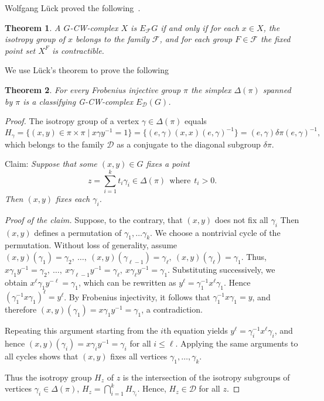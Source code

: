 \documentclass{amsart}
\numberwithin{equation}{section}
\theoremstyle{plain}
\newtheorem{thm}{Theorem}[subsection]
\theoremstyle{definition}
\begin{document}
Wolfgang L\"{u}ck proved the following~\cite{Lu}.
\begin{thm}\label{Lu}
A $G$-CW-complex $X$ is $E_\mathcal FG$ if and only if for each $x\in X$, the isotropy group  of $x$ belongs to the family $\mathcal F$, and for each group $F\in\mathcal F$ the fixed point set $X^F$ is contractible.
\end{thm}
We use L\"{u}ck's theorem to prove the following
\begin{thm}\label{Frob}
For every Frobenius injective group $\pi$ the simplex $\Delta(\pi)$ spanned by $\pi$ is a classifying G-CW-complex $E_{\mathcal D}(G)$.
\end{thm}
\begin{proof}
The isotropy group of a vertex $\gamma\in\Delta(\pi)$ equals
$$H_\gamma=\{(x,y)\in \pi\times\pi\mid x\gamma y^{-1}=1\}=\{(e,\gamma)(x,x)(e,\gamma)^{-1}\}=(e,\gamma)\delta\pi(e,\gamma)^{-1},$$
which belongs to the family $\mathcal D$ as a conjugate to the diagonal subgroup $\delta\pi$.

Claim: {\em Suppose that some $(x,y)\in G$  fixes a point $$z=\sum_{i=1}^k t_i\gamma_i\in\Delta(\pi)\ \ \text{where}\ \ t_i>0.$$
Then $(x,y)$ fixes each $\gamma_i$.}

{\em Proof of the claim.} Suppose, to the contrary, that $(x,y)$ does not fix all $\gamma_i$
Then $(x,y)$ defines a permutation of $\gamma_1,\dots\gamma_k$.
We choose a nontrivial cycle of the permutation.
Without loss of generality, assume $(x,y)(\gamma_1)=\gamma_2,\ 
\dots,\ (x,y)(\gamma_{\ell-1})=\gamma_\ell,\ (x,y)(\gamma_\ell)=\gamma_1.$
Thus, $x\gamma_1y^{-1}=\gamma_2,\ \dots,\ x\gamma_{\ell-1}y^{-1}=\gamma_\ell,\ x\gamma_\ell y^{-1}=\gamma_1$.
Substituting successively, we obtain
$x^\ell\gamma_1y^{-\ell}=\gamma_1$, which can be  rewritten as $y^\ell=\gamma_1^{-1}x^\ell\gamma_1$.
Hence $(\gamma_1^{-1}x\gamma_1)^\ell=y^\ell$. By Frobenius injectivity, it follows that $\gamma_1^{-1}x\gamma_1=y$, and therefore
$(x,y)(\gamma_1)=x\gamma_1y^{-1}=\gamma_1$, a contradiction.

Repeating this argument starting from the $i$th equation yields  $y^\ell=\gamma_i^{-1}x^\ell\gamma_i$, and hence 
$(x,y)(\gamma_i)=x\gamma_iy^{-1}=\gamma_i$ for all $i\le\ell$.
Applying the same arguments to all cycles shows that $(x,y)$ fixes all vertices $\gamma_1,\dots,\gamma_k$.

Thus the isotropy group $H_z$ of $z$  is the intersection of the isotropy subgroups  of vertices $\gamma_i\in\Delta(\pi)$, $H_z=\bigcap_{i=1}^k H_{\gamma_i}$. Hence, $H_z\in\mathcal D$ for all $z$.




\end{proof}
\end{document}
